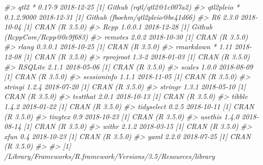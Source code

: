 \documentclass[oneside]{book}
\newenvironment{Shaded}{\begin{snugshade}}{\end{snugshade}}
\newcommand{\CommentTok}[1]{\textcolor[rgb]{0.56,0.35,0.01}{\textit{#1}}}
\begin{document}
\begin{Shaded}
\begin{Highlighting}[]
\CommentTok{#>  qtl2        * 0.17-9     2018-12-25 [1] Github (rqtl/qtl2@1c007a2)       }
\CommentTok{#>  qtl2pleio   * 0.1.2.9000 2018-12-31 [1] Github (fboehm/qtl2pleio@be41d66)}
\CommentTok{#>  R6            2.3.0      2018-10-04 [1] CRAN (R 3.5.0)                   }
\CommentTok{#>  Rcpp          1.0.0.1    2018-12-28 [1] Github (RcppCore/Rcpp@0c9f683)   }
\CommentTok{#>  remotes       2.0.2      2018-10-30 [1] CRAN (R 3.5.0)                   }
\CommentTok{#>  rlang         0.3.0.1    2018-10-25 [1] CRAN (R 3.5.0)                   }
\CommentTok{#>  rmarkdown   * 1.11       2018-12-08 [1] CRAN (R 3.5.0)                   }
\CommentTok{#>  rprojroot     1.3-2      2018-01-03 [1] CRAN (R 3.5.0)                   }
\CommentTok{#>  RSQLite       2.1.1      2018-05-06 [1] CRAN (R 3.5.0)                   }
\CommentTok{#>  scales        1.0.0      2018-08-09 [1] CRAN (R 3.5.0)                   }
\CommentTok{#>  sessioninfo   1.1.1      2018-11-05 [1] CRAN (R 3.5.0)                   }
\CommentTok{#>  stringi       1.2.4      2018-07-20 [1] CRAN (R 3.5.0)                   }
\CommentTok{#>  stringr       1.3.1      2018-05-10 [1] CRAN (R 3.5.0)                   }
\CommentTok{#>  testthat      2.0.1      2018-10-13 [1] CRAN (R 3.5.0)                   }
\CommentTok{#>  tibble        1.4.2      2018-01-22 [1] CRAN (R 3.5.0)                   }
\CommentTok{#>  tidyselect    0.2.5      2018-10-11 [1] CRAN (R 3.5.0)                   }
\CommentTok{#>  tinytex       0.9        2018-10-23 [1] CRAN (R 3.5.0)                   }
\CommentTok{#>  usethis       1.4.0      2018-08-14 [1] CRAN (R 3.5.0)                   }
\CommentTok{#>  withr         2.1.2      2018-03-15 [1] CRAN (R 3.5.0)                   }
\CommentTok{#>  xfun          0.4        2018-10-23 [1] CRAN (R 3.5.0)                   }
\CommentTok{#>  yaml          2.2.0      2018-07-25 [1] CRAN (R 3.5.0)                   }
\CommentTok{#> }
\CommentTok{#> [1] /Library/Frameworks/R.framework/Versions/3.5/Resources/library}
\end{Highlighting}
\end{Shaded}



\printbibliography
\end{document}
